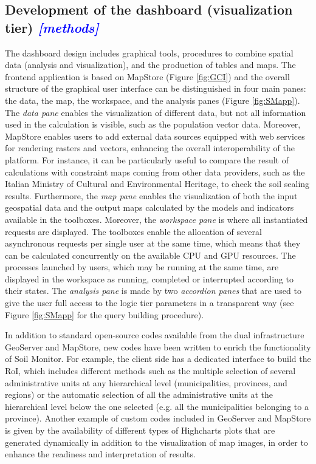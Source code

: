 \documentclass[APA,LATO1COL,doublespace]{WileyNJD-v2}
\newcommand{\update}[1]{\emph{\textcolor{blue}{#1}}}     %
\begin{document}
\subsection{Development of the dashboard (visualization tier) \update{[methods]}}\label{sec:viewTier}
The dashboard design includes graphical tools, procedures to combine spatial data (analysis and visualization), and the production of tables and maps. 
The frontend application is based on MapStore (Figure \ref{fig:GCI}) and the overall structure of the graphical user interface can be distinguished in four main panes: the data, the map, the workspace, and the analysis panes (Figure \ref{fig:SMapp}).
The \textit{data pane} enables the visualization of different data, but not all information used in the calculation is visible, such as the population vector data. 
Moreover, MapStore enables users to add external data sources equipped with web services for rendering rasters and vectors, enhancing the overall interoperability of the platform. 
For instance, it can be particularly useful to compare the result of calculations with constraint maps coming from other data providers, such as the Italian Ministry of Cultural and Environmental Heritage, to check the soil sealing results. Furthermore, the \textit{map pane} enables the visualization of both the input geospatial data and the output maps calculated by the models and indicators available in the toolboxes. 
Moreover, the \textit{workspace pane} is where all instantiated requests are displayed. 
The toolboxes enable the allocation of several asynchronous requests per single user at the same time, which means that they can be calculated concurrently on the available CPU and GPU resources. 
The processes launched by users, which may be running at the same time, are displayed in the workspace as running, completed or interrupted according to their states. 
The \textit{analysis pane} is made by two \textit{accordion panes} that are used to give the user full access to the logic tier parameters in a transparent way (see Figure \ref{fig:SMapp} for the query building procedure).

In addition to standard open-source codes available from the dual infrastructure GeoServer and MapStore, new codes have been written to enrich the functionality of Soil Monitor. 
For example, the client side has a dedicated interface to build the RoI, which includes different methods such as the multiple selection of several administrative units at any hierarchical level (municipalities, provinces, and regions) or the automatic selection of all the administrative units at the hierarchical level below the one selected (e.g. all the municipalities belonging to a province). 
Another example of custom codes included in GeoServer and MapStore is given by the availability of different types of Highcharts plots that are generated dynamically in addition to the visualization of map images, in order to enhance the readiness and interpretation of results.
\end{document}
